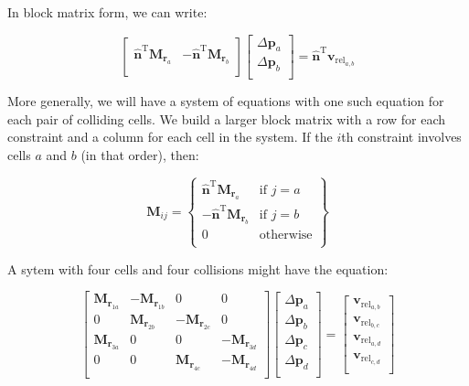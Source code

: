 \documentclass{report}
\renewcommand{\vec}[1]{\mathbf{#1}}
\let\oldhat\hat
\renewcommand{\hat}[1]{\oldhat{\mathbf{#1}}}
\newcommand{\deltap}{\Delta \vec{p}}
\newcommand{\nT}{\hat{n}^\textrm{T}}
\begin{document}
In block matrix form, we can write:

\[
\left[
\begin{array}{cc}
\nT\vec{M}_{\vec{r}_a} & -\nT\vec{M}_{\vec{r}_b} \\
\end{array}
\right]
\left[
\begin{array}{c}
\deltap_a \\
\deltap_b \\
\end{array}
\right]
=
\nT\vec{v}_{\textrm{rel}_{a,b}}
\]

More generally, we will have a system of equations with one such
equation for each pair of colliding cells.  We build a larger block
matrix with a row for each constraint and a column for each cell in
the system.  If the $i$th constraint involves cells $a$ and $b$ (in
that order), then:

\[\vec{M}_{ij} = \left\{
\begin{array}{ll}
\nT\vec{M}_{\vec{r}_a} & \textrm{if } j=a \\
-\nT\vec{M}_{\vec{r}_b} & \textrm{if } j=b \\
0 & \textrm{otherwise} \\
\end{array}
\right\}\]


A sytem with four cells and four collisions might have the equation:

\[
\left[
\begin{array}{cccc}
\vec{M}_{\vec{r}_{1a}} & -\vec{M}_{\vec{r}_{1b}} & 0 & 0 \\
0 & \vec{M}_{\vec{r}_{2b}} & -\vec{M}_{\vec{r}_{2c}} & 0 \\
\vec{M}_{\vec{r}_{3a}} & 0 & 0 & -\vec{M}_{\vec{r}_{3d}} \\
0 & 0 & \vec{M}_{\vec{r}_{4c}} & -\vec{M}_{\vec{r}_{4d}} \\
\end{array}
\right]
\left[
\begin{array}{c}
\deltap_a \\
\deltap_b \\
\deltap_c \\
\deltap_d \\
\end{array}
\right]
=
\left[
\begin{array}{c}
\vec{v}_{\textrm{rel}_{a,b}} \\
\vec{v}_{\textrm{rel}_{b,c}} \\
\vec{v}_{\textrm{rel}_{a,d}} \\
\vec{v}_{\textrm{rel}_{c,d}} \\
\end{array}
\right]
\]
\end{document}
